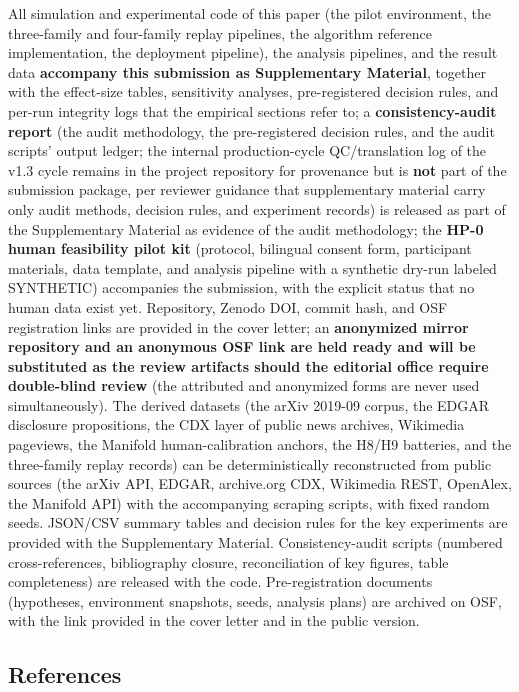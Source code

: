 \documentclass[
  11pt]{article}
\begin{document}
All simulation and experimental code of this paper (the pilot
environment, the three-family and four-family replay pipelines, the
algorithm reference implementation, the deployment pipeline), the
analysis pipelines, and the result data \textbf{accompany this
submission as Supplementary Material}, together with the effect-size
tables, sensitivity analyses, pre-registered decision rules, and per-run
integrity logs that the empirical sections refer to; a
\textbf{consistency-audit report} (the audit methodology, the
pre-registered decision rules, and the audit scripts' output ledger; the
internal production-cycle QC/translation log of the v1.3 cycle remains
in the project repository for provenance but is \textbf{not} part of the
submission package, per reviewer guidance that supplementary material
carry only audit methods, decision rules, and experiment records) is
released as part of the Supplementary Material as evidence of the audit
methodology; the \textbf{HP-0 human feasibility pilot kit} (protocol,
bilingual consent form, participant materials, data template, and
analysis pipeline with a synthetic dry-run labeled SYNTHETIC)
accompanies the submission, with the explicit status that no human data
exist yet. Repository, Zenodo DOI, commit hash, and OSF registration
links are provided in the cover letter; an \textbf{anonymized mirror
repository and an anonymous OSF link are held ready and will be
substituted as the review artifacts should the editorial office require
double-blind review} (the attributed and anonymized forms are never used
simultaneously). The derived datasets (the arXiv 2019-09 corpus, the
EDGAR disclosure propositions, the CDX layer of public news archives,
Wikimedia pageviews, the Manifold human-calibration anchors, the H8/H9
batteries, and the three-family replay records) can be deterministically
reconstructed from public sources (the arXiv API, EDGAR, archive.org
CDX, Wikimedia REST, OpenAlex, the Manifold API) with the accompanying
scraping scripts, with fixed random seeds. JSON/CSV summary tables and
decision rules for the key experiments are provided with the
Supplementary Material. Consistency-audit scripts (numbered
cross-references, bibliography closure, reconciliation of key figures,
table completeness) are released with the code. Pre-registration
documents (hypotheses, environment snapshots, seeds, analysis plans) are
archived on OSF, with the link provided in the cover letter and in the
public version.

\subsection{References}\label{references}
\end{document}
